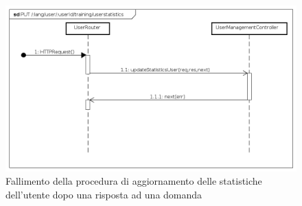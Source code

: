 \begin{itemize}
\begin{figure}[ht]
	\centering
	\includegraphics[scale=0.45]{UML/DiagrammiDiSequenza/Back-end/PUT__lang_user__userId_training_userstatistics_failure.png}
	\caption{Fallimento della procedura di aggiornamento delle statistiche dell'utente dopo una risposta ad una domanda}
\end{figure}
\FloatBarrier

\end{itemize}








